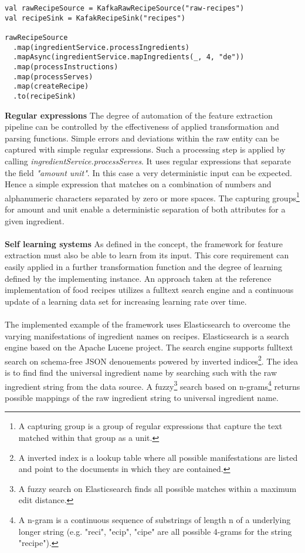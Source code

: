 \begin{lstlisting}[style=myScalastyle,label={lst:pipeline}]
val rawRecipeSource = KafkaRawRecipeSource("raw-recipes")
val recipeSink = KafakRecipeSink("recipes")

rawRecipeSource
  .map(ingredientService.processIngredients)
  .mapAsync(ingredientService.mapIngredients(_, 4, "de"))
  .map(processInstructions)
  .map(processServes)
  .map(createRecipe)
  .to(recipeSink)
\end{lstlisting}

\textbf{Regular expressions}
The degree of automation of the feature extraction pipeline can be controlled by the effectiveness of applied transformation and parsing functions. Simple errors and deviations within the raw entity can be captured with simple regular expressions. Such a processing step is applied by calling \textit{ingredientService.processServes}. It uses regular expressions that separate the field \textit{"amount unit"}. In this case a very deterministic input can be expected. Hence a simple expression that matches on a combination of numbers and alphanumeric characters separated by zero or more spaces. The capturing groups\footnote{A capturing group is a group of regular expressions that capture the text matched within that group as a unit.} for amount and unit enable a deterministic separation of both attributes for a given ingredient.
\\\\
\textbf{Self learning systems}
As defined in the concept, the framework for feature extraction must also be able to learn from its input. This core requirement can easily applied in a further transformation function and the degree of learning defined by the implementing instance. An approach taken at the reference implementation of food recipes utilizes a fulltext search engine and a continuous update of a learning data set for increasing learning rate over time. 
\\\\
The implemented example of the framework uses Elasticsearch to overcome the varying manifestations of ingredient names on recipes. Elasticsearch is a search engine based on the Apache Lucene project. The search engine supports fulltext search on schema-free JSON denouements powered by inverted indices\footnote{A inverted index is a lookup table where all possible manifestations are listed and point to the documents in which they are contained.}. The idea is to find find the universal ingredient name by searching such with the raw ingredient string from the data source. A fuzzy\footnote{A fuzzy search on Elasticsearch finds all possible matches within a maximum edit distance.} search based on n-grams\footnote{A n-gram is a continuous sequence of substrings of length n of a underlying longer string (e.g. "reci", "ecip", "cipe" are all possible 4-grams for the string "recipe").} returns possible mappings of the raw ingredient string to universal ingredient name. 
